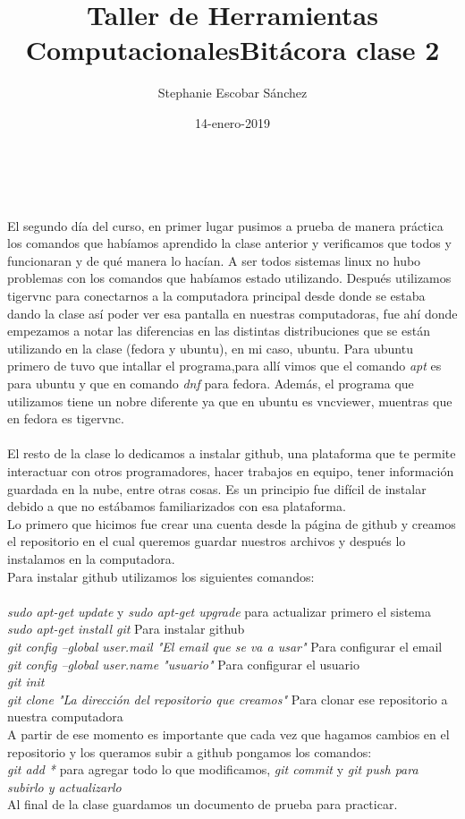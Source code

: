 \documentclass [letterpaper, 12 pts, oneside]{article}
\title{\Huge Taller de Herramientas Computacionales}
\author{Stephanie Escobar Sánchez}
\date{14-enero-2019}
\begin{document}
	\maketitle

	\newpage
	
	\title{\Huge Bitácora clase 2} \\
	\\
	El segundo día del curso, en primer lugar pusimos a prueba de manera práctica los comandos que habíamos aprendido la clase anterior y verificamos que todos y funcionaran y de qué manera lo hacían. A ser todos sistemas linux no hubo problemas con los comandos que habíamos estado utilizando. Después utilizamos tigervnc para conectarnos a la computadora principal desde donde se estaba dando la clase así poder ver esa pantalla en nuestras computadoras, fue ahí donde empezamos a notar las diferencias en las distintas distribuciones que se están utilizando en la clase (fedora y ubuntu), en mi caso, ubuntu. Para ubuntu primero de tuvo que intallar el programa,para allí vimos que el comando \textit{apt} es para ubuntu y que en comando \textit{dnf} para fedora. Además, el programa que utilizamos tiene un nobre diferente ya que en ubuntu es vncviewer, muentras que en fedora es tigervnc. \\
	\\
	El resto de la clase lo dedicamos a instalar github, una plataforma que te permite interactuar con otros programadores, hacer trabajos en equipo, tener información guardada en la nube, entre otras cosas. Es un principio fue difícil de instalar debido a que no estábamos familiarizados con esa plataforma. \\
	Lo primero que hicimos fue crear una cuenta desde la página de github y creamos el repositorio en el cual queremos guardar nuestros archivos  y después lo instalamos en la computadora.\\
	Para instalar github utilizamos los siguientes comandos:\\
	\\
	\textit{sudo apt-get update} y \textit{sudo apt-get upgrade} para actualizar primero el sistema\\
	\textit{sudo apt-get install git} Para instalar github\\
	\textit{git config --global user.mail "El email que se va a usar"} Para configurar el email\\
	\textit{git config --global user.name "usuario"} Para configurar el usuario\\
    \textit{ git init}\\
    \textit{ git clone "La dirección del repositorio que creamos"} Para clonar ese repositorio a nuestra computadora\\
    
    A partir de ese momento es importante que cada vez que hagamos cambios en el repositorio y los queramos subir a github pongamos los comandos:\\
    \textit{git add *} para agregar todo lo que modificamos,
    \textit{git commit} y \textit{git push para subirlo y actualizarlo}\\
    Al final de la clase guardamos un documento de prueba para practicar.
 
	
	
\end{document}
